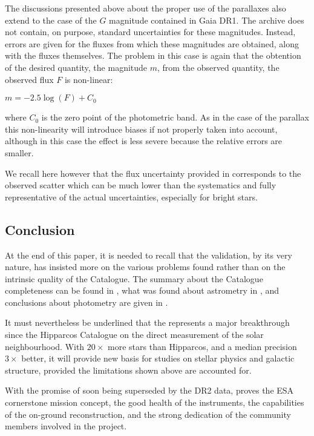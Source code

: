 The discussions presented above about the proper use of the parallaxes
also extend to the case of the $G$ magnitude contained
in Gaia DR1. The archive does not contain, on purpose, standard uncertainties for
these magnitudes. Instead, errors are given for the fluxes from which
these magnitudes are obtained, along with the fluxes themselves. The problem
in this case is again that the obtention of the desired quantity, 
the magnitude $m$, from the observed quantity, the observed flux
$F$ is non-linear:

$m = -2.5 \log(F) + C_0$

\noindent where $C_0$ is the zero point of the photometric band.
As in the case of the parallax this non-linearity will introduce
biases if not properly taken into account, although in this case
the effect is less severe because the relative errors are smaller.

We recall here however that the flux uncertainty provided in {} corresponds to the observed scatter which can be much lower than the systematics and  fully representative of the actual uncertainties, especially for bright stars. 




\subsection{Conclusion}

At the end of this paper, it is needed to recall that the validation, 
by its very nature, has insisted more on the various problems found rather 
than on the intrinsic quality of the Catalogue. The summary about 
the Catalogue completeness can be found in ,
what was found about astrometry in , and conclusions 
about photometry are given in .

It must nevertheless be underlined that the {} represents 
a major breakthrough since the Hipparcos Catalogue
on the direct measurement of the solar neighbourhood. With $20\times$ 
more stars than Hipparcos, and a median precision $3\times$ better,
it will provide new basis for studies on stellar physics and galactic
structure, provided the limitations shown above are accounted for.

With the promise of soon being superseded by the {\gaia} DR2 data,
{} proves the ESA cornerstone mission concept, the good health of the 
instruments, the capabilities of the on-ground reconstruction, 
and the strong dedication of the community members involved in the project.


